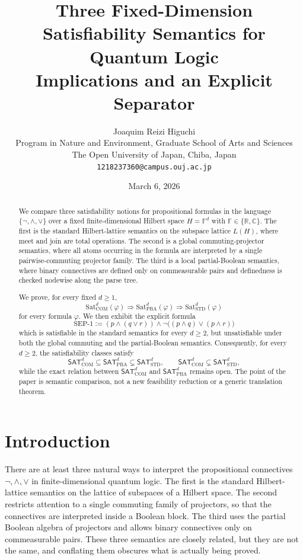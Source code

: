 \documentclass[11pt]{article}
\title{Three Fixed-Dimension Satisfiability Semantics for Quantum Logic\\[0.35em]
\large Implications and an Explicit Separator}
\author{Joaquim Reizi Higuchi\\
Program in Nature and Environment, Graduate School of Arts and Sciences\\
The Open University of Japan, Chiba, Japan\\
\texttt{1218237360@campus.ouj.ac.jp}}
\date{March 6, 2026}
\theoremstyle{plain}
\theoremstyle{definition}
\newcommand{\STD}{\mathrm{STD}}
\newcommand{\COM}{\mathrm{COM}}
\newcommand{\PBA}{\mathrm{PBA}}
\newcommand{\Sat}{\mathrm{Sat}}
\newcommand{\SEPone}{\mathrm{SEP}\text{-}1}
\newcommand{\field}{\mathbb{F}}
\begin{document}
\maketitle

\begin{abstract}
We compare three satisfiability notions for propositional formulas in the language
$\{\neg,\wedge,\vee\}$ over a fixed finite-dimensional Hilbert space $H=\field^d$
with $\field\in\{\mathbb{R},\mathbb{C}\}$.
The first is the standard Hilbert-lattice semantics on the subspace lattice $L(H)$,
where meet and join are total operations.
The second is a global commuting-projector semantics, where all atoms occurring in the formula are interpreted by a single pairwise-commuting projector family.
The third is a local partial-Boolean semantics, where binary connectives are defined only on commeasurable pairs and definedness is checked nodewise along the parse tree.

We prove, for every fixed $d\geq 1$,
\[
\Sat_{\COM}^d(\varphi) \Longrightarrow \Sat_{\PBA}^d(\varphi) \Longrightarrow \Sat_{\STD}^d(\varphi)
\]
for every formula $\varphi$.
We then exhibit the explicit formula
\[
\SEPone := (p\wedge(q\vee r))\wedge \neg\bigl((p\wedge q)\vee(p\wedge r)\bigr)
\]
which is satisfiable in the standard semantics for every $d\geq 2$, but unsatisfiable under both the global commuting and the partial-Boolean semantics.
Consequently, for every $d\geq 2$, the satisfiability classes satisfy
\[
\mathsf{SAT}_{\COM}^d \subseteq \mathsf{SAT}_{\PBA}^d \subsetneq \mathsf{SAT}_{\STD}^d,
\qquad
\mathsf{SAT}_{\COM}^d \subsetneq \mathsf{SAT}_{\STD}^d,
\]
while the exact relation between $\mathsf{SAT}_{\COM}^d$ and $\mathsf{SAT}_{\PBA}^d$ remains open.
The point of the paper is semantic comparison, not a new feasibility reduction or a generic translation theorem.
\end{abstract}

\section{Introduction}

There are at least three natural ways to interpret the propositional connectives
$\neg,\wedge,\vee$ in finite-dimensional quantum logic.
The first is the standard Hilbert-lattice semantics on the lattice of subspaces of a Hilbert space.
The second restricts attention to a single commuting family of projectors, so that the connectives are interpreted inside a Boolean block.
The third uses the partial Boolean algebra of projectors and allows binary connectives only on commeasurable pairs.
These three semantics are closely related, but they are not the same, and conflating them obscures what is actually being proved.
\end{document}
